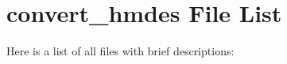 \section{convert\_\-hmdes File List}
Here is a list of all files with brief descriptions:\begin{CompactList}
\item{}
\end{CompactList}
